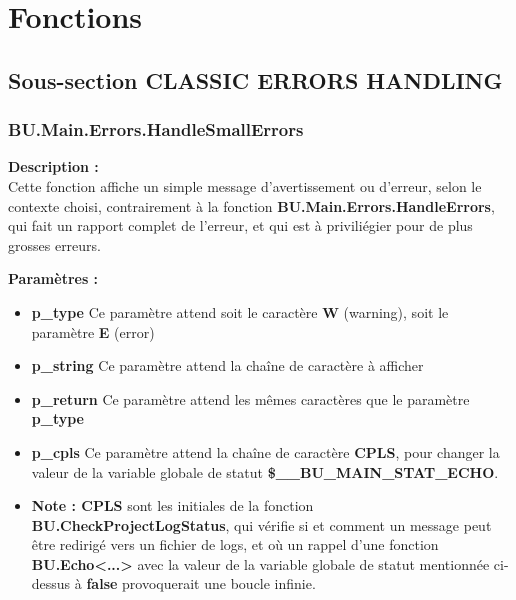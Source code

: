 \documentclass[a4paper,10pt]{article}
\begin{document}
\color{red}
\section{Fonctions}\color{white}

\color{green}
\subsection{Sous-section CLASSIC ERRORS HANDLING}\color{white}

\color{blue}
\subsubsection{BU.Main.Errors.HandleSmallErrors}\color{white}

\begin{justify}
    \textbf{Description :}\\
    Cette fonction affiche un simple message d'avertissement ou d'erreur, selon le contexte choisi, contrairement à la fonction \textbf{\color{mauve}BU.Main.Errors.HandleErrors}, qui fait un rapport complet de l'erreur, et qui est à priviliégier pour de plus grosses erreurs.
\end{justify}

\begin{justify}
    \textbf{Paramètres :}

    \begin{itemize}
        \item \textbf{\color{orange}p\_type} Ce paramètre attend soit le caractère \textbf{W} (warning), soit le paramètre \textbf{E} (error)\\

        \item \textbf{\color{orange}p\_string} Ce paramètre attend la chaîne de caractère à afficher\\

        \item \textbf{\color{orange}p\_return} Ce paramètre attend les mêmes caractères que le paramètre \textbf{\color{orange}p\_type}\\

        \item \textbf{\color{orange}p\_cpls} Ce paramètre attend la chaîne de caractère \textbf{CPLS}, pour changer la valeur de la variable globale de statut \textbf{\color{orange}\$\_\_BU\_MAIN\_STAT\_ECHO}.\\

        \item \textbf{Note : CPLS} sont les initiales de la fonction \textbf{\color{mauve}BU.CheckProjectLogStatus}, qui vérifie si et comment un message peut être redirigé vers un fichier de logs, et où un rappel d'une fonction \textbf{\color{mauve}BU.Echo<...>} avec la valeur de la variable globale de statut mentionnée ci-dessus à \textbf{false} provoquerait une boucle infinie.
    \end{itemize}
\end{justify}
\end{document}
